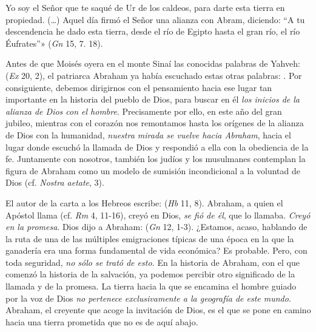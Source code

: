 \begin{body}
\ltr[1. «] Yo soy el Señor que te saqué de Ur de los caldeos, para darte esta tierra en propiedad. (\ldots) Aquel día firmó el Señor una alianza con Abram, diciendo: “A tu descendencia he dado esta tierra, desde el río de Egipto hasta el gran río, el río Éufrates”» (\textit{Gn} 15, 7. 18).

Antes de que Moisés oyera en el monte Sinaí las conocidas palabras de Yahveh:  (\textit{Ex} 20, 2), el patriarca Abraham ya había escuchado estas otras palabras: . Por consiguiente, debemos dirigirnos con el pensamiento hacia ese lugar tan importante en la historia del pueblo de Dios, para buscar en él \textit{los inicios de la alianza de Dios con el hombre}. Precisamente por ello, en este año del gran jubileo, mientras con el corazón nos remontamos hasta los orígenes de la alianza de Dios con la humanidad, \textit{nuestra mirada se vuelve hacia Abraham}, hacia el lugar donde escuchó la llamada de Dios y respondió a ella con la obediencia de la fe. Juntamente con nosotros, también los judíos y los musulmanes contemplan la figura de Abraham como un modelo de sumisión incondicional a la voluntad de Dios (cf. \textit{Nostra aetate}, 3).

El autor de la carta a los Hebreos escribe:  (\textit{Hb} 11, 8). Abraham, a quien el Apóstol llama  (cf. \textit{Rm} 4, 11-16), creyó en Dios, \textit{se fió de él}, que lo llamaba. \textit{Creyó en la promesa}. Dios dijo a Abraham:  (\textit{Gn} 12, 1-3). ¿Estamos, acaso, hablando de la ruta de una de las múltiples emigraciones típicas de una época en la que la ganadería era una forma fundamental de vida económica? Es probable. Pero, con toda seguridad, \textit{no sólo se trató de esto.} En la historia de Abraham, con el que comenzó la historia de la salvación, ya podemos percibir otro significado de la llamada y de la promesa. La tierra hacia la que se encamina el hombre guiado por la voz de Dios \textit{no pertenece exclusivamente a la geografía de este mundo}. Abraham, el creyente que acoge la invitación de Dios, es el que se pone en camino hacia una tierra prometida que no es de aquí abajo.


\end{body}
